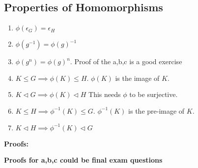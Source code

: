 \documentclass[openany]{report}
\begin{document}
\subsection{Properties of Homomorphisms}
\begin{enumerate}[label=(\alph*)]
    \item $\phi(\epsilon_G) = \epsilon_H$
    \item $\phi(g^{-1}) = \phi(g)^{-1}$
    \item $\phi(g^n) = \phi(g)^n$. Proof of the a,b,c is a good exercise
    \item $K \leq G \implies \phi(K) \leq H$. $\phi(K)$ is the image of $K$.
    \item $K \triangleleft G \implies \phi(K) \triangleleft H$ This needs $\phi$ to be surjective.
    \item $K \leq H \implies \phi^{-1}(K) \leq G$. $\phi^{-1}(K)$ is the pre-image of $K$.
    \item $K \triangleleft H \implies \phi^{-1}(K) \triangleleft G$
\end{enumerate}
\textbf{Proofs:}
\begin{center}
    \textbf{ Proofs for a,b,c could be final exam questions}
\end{center}
\end{document}
